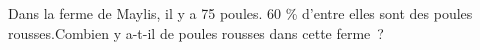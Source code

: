 \documentclass[exercice]{thedocument}%
\begin{document}
%
Dans la ferme de Maylis, il y a 75 poules. 60 \% d'entre elles
sont des poules rousses.\vskip5pt\noindent Combien y a-t-il de poules rousses
dans cette ferme~?
\end{document}

